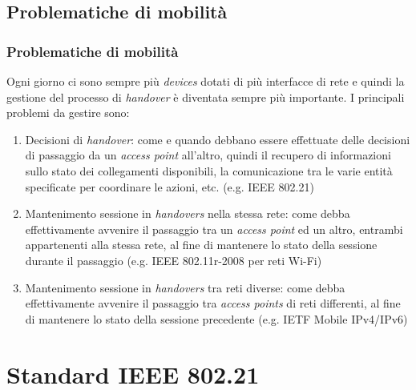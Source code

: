 \documentclass[10pt]{beamer}
\begin{document}
\subsection{Problematiche di mobilità}
\begin{frame}
\frametitle{Problematiche di mobilità}
Ogni giorno ci sono sempre più {\em devices} dotati di più interfacce di rete e quindi la gestione del processo di {\em handover} è diventata sempre più importante. I principali problemi da gestire sono:
\begin{enumerate}
\item Decisioni di {\em handover}: come e quando debbano essere effettuate delle decisioni di passaggio da un {\em access point} all'altro, quindi il recupero di informazioni sullo stato dei collegamenti disponibili, la comunicazione tra le varie entità specificate per coordinare le azioni, etc. (e.g. IEEE 802.21)
\item Mantenimento sessione in {\em handovers} nella stessa rete: come debba effettivamente avvenire il passaggio tra un {\em access point} ed un altro, entrambi appartenenti alla stessa rete, al fine di mantenere lo stato della sessione durante il passaggio (e.g. IEEE 802.11r-2008 per reti Wi-Fi)
\item Mantenimento sessione in {\em handovers} tra reti diverse: come debba effettivamente avvenire il passaggio tra {\em access points} di reti differenti, al fine di mantenere lo stato della sessione precedente (e.g. IETF Mobile IPv4/IPv6)
\end{enumerate}
\end{frame}


\section{Standard IEEE 802.21}
\end{document}
